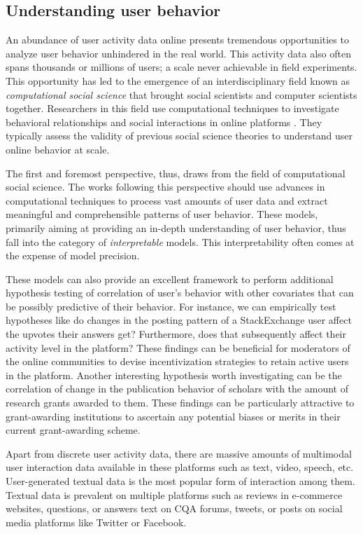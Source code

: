 \subsection{Understanding user behavior}
An abundance of user activity data online presents tremendous opportunities to analyze user behavior unhindered in the real world. This activity data also often spans thousands or millions of users; a scale never achievable in field experiments. This opportunity has led to the emergence of an interdisciplinary field known as \emph{computational social science} that brought social scientists and computer scientists together. Researchers in this field use computational techniques to investigate behavioral relationships and social interactions in online platforms \cite{womenwiki, evaluating}. They typically assess the validity of previous social science theories to understand user online behavior at scale.

The first and foremost perspective, thus, draws from the field of computational social science. The works following this perspective should use advances in computational techniques to process vast amounts of user data and extract meaningful and comprehensible patterns of user behavior. These models, primarily aiming at providing an in-depth understanding of user behavior, thus fall into the category of \emph{interpretable} models. This interpretability often comes at the expense of model precision.

These models can also provide an excellent framework to perform additional hypothesis testing of correlation of user's behavior with other covariates that can be possibly predictive of their behavior. For instance, we can empirically test hypotheses like do changes in the posting pattern of a StackExchange user affect the upvotes their answers get? Furthermore, does that subsequently affect their activity level in the platform? These findings can be beneficial for moderators of the online communities to devise incentivization strategies to retain active users in the platform. Another interesting hypothesis worth investigating can be the correlation of change in the publication behavior of scholars with the amount of research grants awarded to them. These findings can be particularly attractive to grant-awarding institutions to ascertain any potential biases or merits in their current grant-awarding scheme.

Apart from discrete user activity data, there are massive amounts of multimodal user interaction data available in these platforms such as text, video, speech, etc.
User-generated textual data is the most popular form of interaction among them. Textual data is prevalent on multiple platforms such as reviews in e-commerce websites, questions, or answers text on CQA forums, tweets, or posts on social media platforms like Twitter or Facebook.

